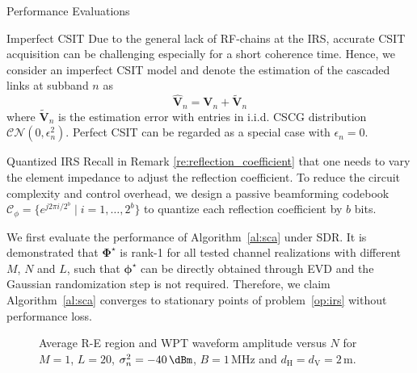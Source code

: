 \documentclass[journal]{IEEEtran}
\begin{document}
\begin{section}{Performance Evaluations}
		\begin{subsection}{Imperfect CSIT}
			Due to the general lack of RF-chains at the IRS, accurate CSIT acquisition can be challenging especially for a short coherence time. Hence, we consider an imperfect CSIT model and denote the estimation of the cascaded links at subband $n$ as
			\begin{equation}
				\hat{\boldsymbol{V}}_{n} = \boldsymbol{V}_{n} + \tilde{\boldsymbol{V}}_{n}
			\end{equation}
			where $\tilde{\boldsymbol{V}}_{n}$ is the estimation error with entries in i.i.d. CSCG distribution $\mathcal{CN}(0, \epsilon_{n}^2)$. Perfect CSIT can be regarded as a special case with $\epsilon_{n} = 0$. %
		\end{subsection}

		\begin{subsection}{Quantized IRS}
			Recall in Remark \ref{re:reflection_coefficient} that one needs to vary the element impedance to adjust the reflection coefficient. To reduce the circuit complexity and control overhead, we design a passive beamforming codebook $\mathcal{C}_\phi = \{e^{j 2 \pi i / 2^b} \mid i = 1, \dots, 2^b\}$ to quantize each reflection coefficient by $b$ bits.
		\end{subsection}

		We first evaluate the performance of Algorithm~\ref{al:sca} under SDR. It is demonstrated that $\boldsymbol{\Phi}^{\star}$ is rank-\num{1} for all tested channel realizations with different $M$, $N$ and $L$, such that $\boldsymbol{\phi}^{\star}$ can be directly obtained through EVD and the Gaussian randomization step is not required. Therefore, we claim Algorithm~\ref{al:sca} converges to stationary points of problem~\eqref{op:irs} without performance loss.

		\begin{figure}[!t]
			\centering
			\caption{Average R-E region and WPT waveform amplitude versus $N$ for $M=1$, $L=20$, $\sigma_n^2=-40\,\si{\dBm}$, $B=1\,\si{\MHz}$ and $d_{\mathrm{H}}=d_{\mathrm{V}}=2\,\si{\meter}$.}
		\end{figure}


\end{section}
\end{document}
